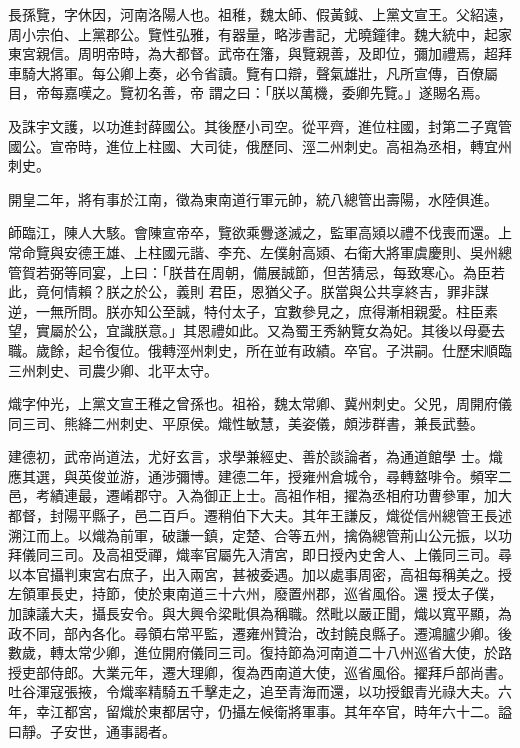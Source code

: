 
\begin{pinyinscope}

 長孫覽，字休因，河南洛陽人也。祖稚，魏太師、假黃鉞、上黨文宣王。父紹遠，周小宗伯、上黨郡公。覽性弘雅，有器量，略涉書記，尤曉鐘律。魏大統中，起家東宮親信。周明帝時，為大都督。武帝在籓，與覽親善，及即位，彌加禮焉，超拜車騎大將軍。每公卿上奏，必令省讀。覽有口辯，聲氣雄壯，凡所宣傳，百僚屬目，帝每嘉嘆之。覽初名善，帝
 謂之曰：「朕以萬機，委卿先覽。」遂賜名焉。



 及誅宇文護，以功進封薛國公。其後歷小司空。從平齊，進位柱國，封第二子寬管國公。宣帝時，進位上柱國、大司徒，俄歷同、涇二州刺史。高祖為丞相，轉宜州刺史。



 開皇二年，將有事於江南，徵為東南道行軍元帥，統八總管出壽陽，水陸俱進。



 師臨江，陳人大駭。會陳宣帝卒，覽欲乘釁遂滅之，監軍高熲以禮不伐喪而還。上常命覽與安德王雄、上柱國元諧、李充、左僕射高熲、右衛大將軍虞慶則、吳州總管賀若弼等同宴，上曰：「朕昔在周朝，備展誠節，但苦猜忌，每致寒心。為臣若此，竟何情賴？朕之於公，義則
 君臣，恩猶父子。朕當與公共享終吉，罪非謀逆，一無所問。朕亦知公至誠，特付太子，宜數參見之，庶得漸相親愛。柱臣素望，實屬於公，宜識朕意。」其恩禮如此。又為蜀王秀納覽女為妃。其後以母憂去職。歲餘，起令復位。俄轉涇州刺史，所在並有政績。卒官。子洪嗣。仕歷宋順臨三州刺史、司農少卿、北平太守。



 熾字仲光，上黨文宣王稚之曾孫也。祖裕，魏太常卿、冀州刺史。父兕，周開府儀同三司、熊絳二州刺史、平原侯。熾性敏慧，美姿儀，頗涉群書，兼長武藝。



 建德初，武帝尚道法，尤好玄言，求學兼經史、善於談論者，為通道館學
 士。熾應其選，與英俊並游，通涉彌博。建德二年，授雍州倉城令，尋轉盩啡令。頻宰二邑，考績連最，遷崤郡守。入為御正上士。高祖作相，擢為丞相府功曹參軍，加大都督，封陽平縣子，邑二百戶。遷稍伯下大夫。其年王謙反，熾從信州總管王長述溯江而上。以熾為前軍，破謙一鎮，定楚、合等五州，擒偽總管荊山公元振，以功拜儀同三司。及高祖受禪，熾率官屬先入清宮，即日授內史舍人、上儀同三司。尋以本官攝判東宮右庶子，出入兩宮，甚被委遇。加以處事周密，高祖每稱美之。授左領軍長史，持節，使於東南道三十六州，廢置州郡，巡省風俗。還
 授太子僕，加諫議大夫，攝長安令。與大興令梁毗俱為稱職。然毗以嚴正聞，熾以寬平顯，為政不同，部內各化。尋領右常平監，遷雍州贊治，改封饒良縣子。遷鴻臚少卿。後數歲，轉太常少卿，進位開府儀同三司。復持節為河南道二十八州巡省大使，於路授吏部侍郎。大業元年，遷大理卿，復為西南道大使，巡省風俗。擢拜戶部尚書。吐谷渾寇張掖，令熾率精騎五千擊走之，追至青海而還，以功授銀青光祿大夫。六年，幸江都宮，留熾於東都居守，仍攝左候衛將軍事。其年卒官，時年六十二。謚曰靜。子安世，通事謁者。




\end{pinyinscope}
